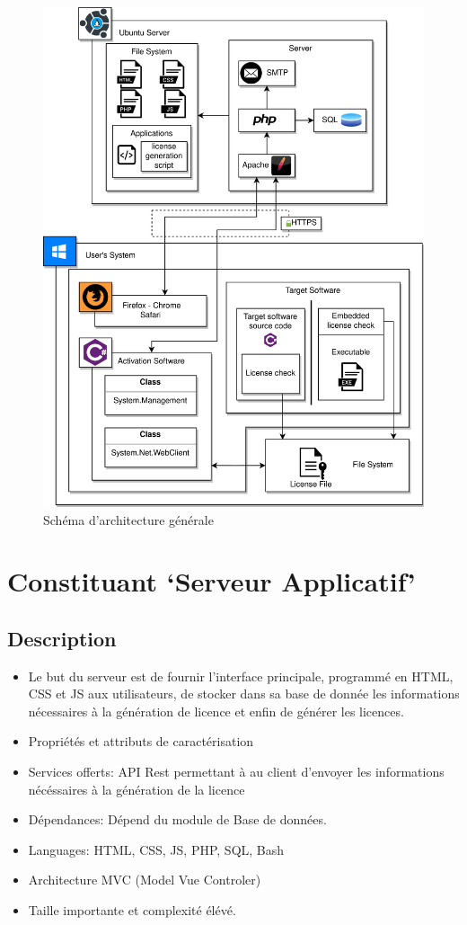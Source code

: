 \begin{figure}[h!]
	\centering
	\includegraphics{../png/DAT_general.png}
	\caption{Schéma d'architecture générale}
	\label{fig:fig1}
\end{figure}
\newpage

\section{Constituant `Serveur Applicatif'}
\subsection{Description}
\begin{itemize}
	\item Le but du serveur est de fournir l'interface principale, programmé 
				en HTML, CSS et JS aux utilisateurs, de stocker dans sa base de donnée
				les informations nécessaires à la génération de licence et enfin de générer 
				les licences.
	\item Propriétés et attributs de caractérisation
	\item Services offerts: API Rest permettant à au client d'envoyer les informations
				nécéssaires à la génération de la licence 
	\item	Dépendances: Dépend du module de Base de données.
	\item Languages: HTML, CSS, JS, PHP, SQL, Bash 
	\item Architecture MVC (Model Vue Controler)
	\item Taille importante et complexité élévé.
\end{itemize}
